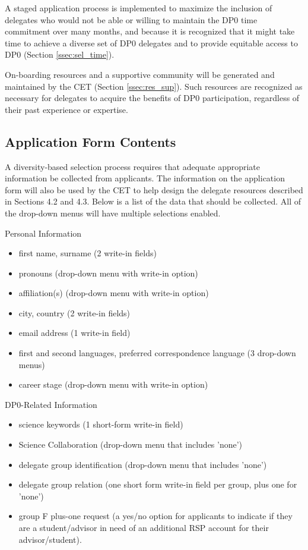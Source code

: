 \documentclass[DM,lsstdraft,authoryear,toc]{lsstdoc}
\begin{document}
A staged application process is implemented to maximize the inclusion of delegates who would not be able or willing to maintain the DP0 time commitment over many months, and because it is recognized that it might take time to achieve a diverse set of DP0 delegates and to provide equitable access to DP0 (Section \ref{ssec:sel_time}).

On-boarding resources and a supportive community will be generated and maintained by the CET (Section \ref{ssec:res_sup}).
Such resources are recognized as necessary for delegates to acquire the benefits of DP0 participation, regardless of their past experience or expertise. 

\subsection{Application Form Contents}\label{ssec:sel_form}

A diversity-based selection process requires that adequate appropriate information be collected from applicants.
The information on the application form will also be used by the CET to help design the delegate resources described in Sections 4.2 and 4.3. 
Below is a list of the data that should be collected.
All of the drop-down menus will have multiple selections enabled.

Personal Information
\begin{itemize}
\item first name, surname (2 write-in fields)
\item pronouns (drop-down menu with write-in option)
\item affiliation(s) (drop-down menu with write-in option)
\item city, country (2 write-in fields)
\item email address (1 write-in field)
\item first and second languages, preferred correspondence language (3 drop-down menus)
\item career stage (drop-down menu with write-in option)
\end{itemize}

DP0-Related Information
\begin{itemize}
\item science keywords (1 short-form write-in field)
\item Science Collaboration (drop-down menu that includes 'none')
\item delegate group identification (drop-down menu that includes 'none')
\item delegate group relation (one short form write-in field per group, plus one for 'none')
\item group F plus-one request (a yes/no option for applicants to indicate if they are a student/advisor in need of an additional RSP account for their advisor/student).
\end{itemize}
\end{document}
